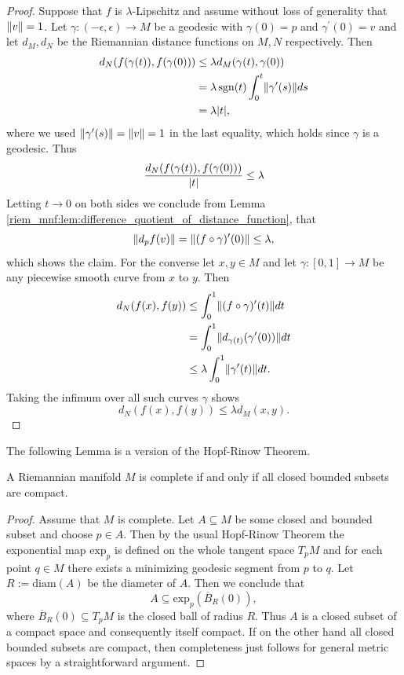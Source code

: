\begin{proof}
    Suppose that $f$ is $\lambda$-Lipschitz and assume without loss of generality that $\lVert v\rVert = 1$. Let $\gamma \colon (-\epsilon,\epsilon) \to M$ be a geodesic with $\gamma(0) = p$ and $\gamma^\prime(0) = v$ and let $d_M, d_N$ be the Riemannian distance functions on $M,N$ respectively. Then 
    \begin{align*}
        d_N(f(\gamma(t)),f(\gamma(0))) &\leq \lambda d_M(\gamma(t),\gamma(0)) \\
        &= \lambda \, \mathrm{sgn}(t) \int_{0}^t \lVert\gamma^\prime(s)\rVert ds \\
        &= \lambda \lvert t\rvert,
    \end{align*}
    where we used $\lVert\gamma^\prime(s)\rVert = \lVert v\rVert = 1$ in the last equality, which holds since $\gamma$ is a geodesic. Thus
    \[
    \frac{d_N(f(\gamma(t)),f(\gamma(0)))}{\lvert t\rvert} \leq \lambda
    \] 
    Letting $t \to 0$ on both sides we conclude from Lemma \ref{riem_mnf:lem:difference_quotient_of_distance_function}, that 
    \[
    \lVert d_pf(v)\rVert = \lVert(f \circ \gamma)^\prime(0)\rVert \leq \lambda,
    \]
    which shows the claim. For the converse let $x, y \in M$ and let $\gamma \colon [0,1] \to M$ be any piecewise smooth curve from $x$ to $y$. Then 
    \begin{align*}
        d_N(f(x),f(y)) &\leq \int_0^1 \lVert(f \circ \gamma)^\prime(t)\rVert dt \\
        &= \int_0^1 \lVert d_{\gamma(t)}(\gamma^\prime(0))\rVert dt \\
        & \leq \lambda \int_0^1 \lVert\gamma^\prime(t)\rVert dt.
    \end{align*}
    Taking the infimum over all such curves $\gamma$ shows 
    \[
    d_N(f(x),f(y)) \leq \lambda d_M(x,y).
    \]
\end{proof}

The following Lemma is a version of the Hopf-Rinow Theorem.

\begin{lemma}
    A Riemannian manifold $M$ is complete if and only if all closed bounded subsets are compact.
\end{lemma}

\begin{proof}
    Assume that $M$ is complete. Let $A \subseteq M$ be some closed and bounded subset and choose $p \in A$. Then by the usual Hopf-Rinow Theorem the exponential map $\mathrm{exp}_p$ is defined on the whole tangent space $T_p M$ and for each point $q \in M$ there exists a minimizing geodesic segment from $p$ to $q$. Let $R := \mathrm{diam}(A)$ be the diameter of $A$. Then we conclude that 
    \[
    A \subseteq \mathrm{exp}_p(\overline{B}_R(0)),
    \]
    where $\overline{B}_R(0) \subseteq T_pM$ is the closed ball of radius $R$. Thus $A$ is a closed subset of a compact space and consequently itself compact. If on the other hand all closed bounded subsets are compact, then completeness just follows for general metric spaces by a straightforward argument.
\end{proof}

